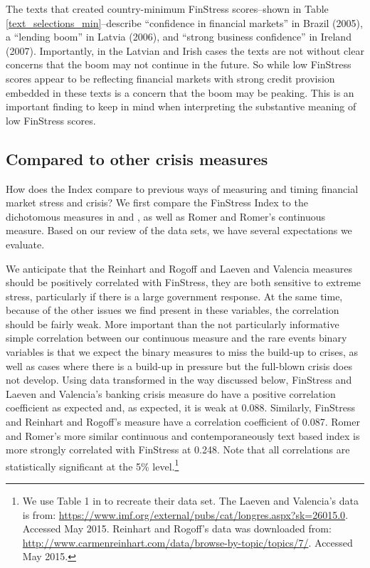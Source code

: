 \documentclass[]{article}
\begin{document}
The texts that created country-minimum FinStress scores--shown in Table \ref{text_selections_min}--describe ``confidence in financial markets'' in Brazil (2005), a ``lending boom'' in Latvia (2006), and ``strong business confidence'' in Ireland (2007). Importantly, in the Latvian and Irish cases the texts are not without clear concerns that the boom may not continue in the future. So while low FinStress scores appear to be reflecting financial markets with strong credit provision embedded in these texts is a concern that the boom may be peaking. This is an important finding to keep in mind when interpreting the substantive meaning of low FinStress scores.

\subsection{Compared to other crisis
measures}\label{comparison-to-other-crisis-measures}

How does the Index compare to previous ways of measuring and timing financial market stress and crisis? We first compare the FinStress Index to the dichotomous measures in \cite{Reinhart2009} and \cite{laeven2013}, as well as Romer and Romer's \citeyearpar{Romer2015} continuous measure. Based on our review of the data sets, we have several expectations we evaluate.

We anticipate that the Reinhart and Rogoff and Laeven and Valencia measures should be positively correlated with FinStress, they are both sensitive to extreme stress, particularly if there is a large government response.  At the same time, because of the other issues we find present in these variables, the correlation should be fairly weak. More important than the not particularly informative simple correlation between our continuous measure and the rare events binary variables is that we expect the binary measures to miss the build-up to crises, as well as cases where there is a build-up in pressure but the full-blown crisis does not develop. Using data transformed in the way discussed below, FinStress and Laeven and Valencia's banking crisis measure do have a positive correlation coefficient as expected and, as expected, it is weak at 0.088. Similarly, FinStress and Reinhart and Rogoff's measure have a correlation coefficient of 0.087. Romer and Romer's more similar continuous and contemporaneously text based index is more strongly correlated with FinStress at 0.248. Note that all correlations are statistically significant at the 5\% level.\footnote{We use Table 1 in \cite{Romer2015} to recreate their data set. The Laeven and Valencia's data is from: \url{https://www.imf.org/external/pubs/cat/longres.aspx?sk=26015.0}.
  Accessed May 2015. Reinhart and Rogoff's data was downloaded from:
  \url{http://www.carmenreinhart.com/data/browse-by-topic/topics/7/}.
  Accessed May 2015.}
\end{document}
